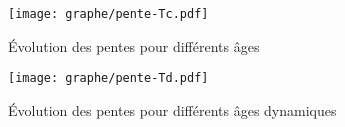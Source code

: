 				\begin{figure}[h!]
					\centering \texttt{[image: graphe/pente-Tc.pdf]}
					\caption{Évolution des pentes pour différents âges}
					\label{Pente-lin_dim}
				\end{figure}

				\begin{figure}[h!]
					\centering \texttt{[image: graphe/pente-Td.pdf]}
					\caption{Évolution des pentes pour différents âges dynamiques}
					\label{Pente-Td-lin}
				\end{figure}

